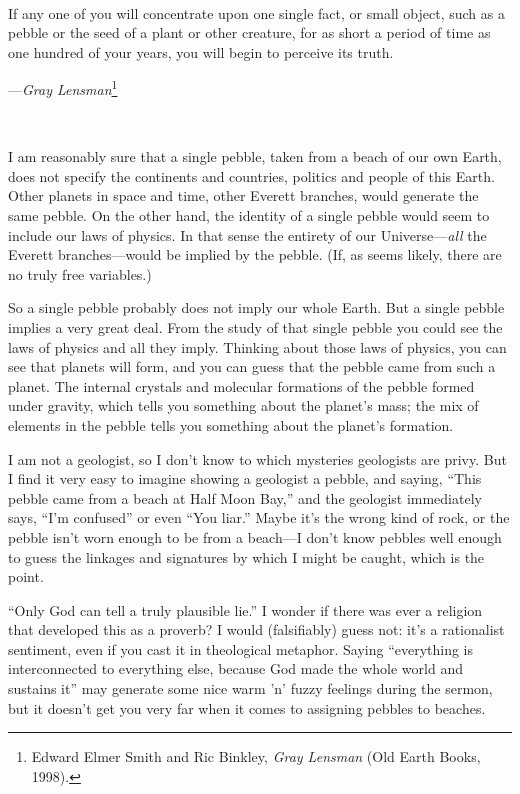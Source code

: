 \bigskip

{
 ~}

{
 If any one of you will concentrate upon one single fact, or small
object, such as a pebble or the seed of a plant or other creature, for
as short a period of time as one hundred of your years, you will begin
to perceive its truth.}

{\raggedleft
 {}---\textit{Gray Lensman}\footnote{Edward Elmer Smith and Ric Binkley, \textit{Gray Lensman} (Old
Earth Books, 1998).}
\par}


\bigskip

{
 ~}

{
 I am reasonably sure that a single pebble, taken from a beach of
our own Earth, does not specify the continents and countries, politics
and people of this Earth. Other planets in space and time, other
Everett branches, would generate the same pebble. On the other hand,
the identity of a single pebble would seem to include our laws of
physics. In that sense the entirety of our Universe---\textit{all} the
Everett branches---would be implied by the pebble. (If, as seems
likely, there are no truly free variables.)}

{
 So a single pebble probably does not imply our whole Earth. But a
single pebble implies a very great deal. From the study of that single
pebble you could see the laws of physics and all they imply. Thinking
about those laws of physics, you can see that planets will form, and
you can guess that the pebble came from such a planet. The internal
crystals and molecular formations of the pebble formed under gravity,
which tells you something about the planet's mass; the
mix of elements in the pebble tells you something about the
planet's formation.}

{
 I am not a geologist, so I don't know to which
mysteries geologists are privy. But I find it very easy to imagine
showing a geologist a pebble, and saying, ``This
pebble came from a beach at Half Moon Bay,'' and the
geologist immediately says, ``I'm
confused'' or even ``You
liar.'' Maybe it's the wrong kind of
rock, or the pebble isn't worn enough to be from a
beach---I don't know pebbles well enough to guess the
linkages and signatures by which I might be caught, which is the
point.}

{
 ``Only God can tell a truly plausible
lie.'' I wonder if there was ever a religion that
developed this as a proverb? I would (falsifiably) guess not:
it's a rationalist sentiment, even if you cast it in
theological metaphor. Saying ``everything is
interconnected to everything else, because God made the whole world and
sustains it'' may generate some nice warm
'n' fuzzy feelings during the sermon,
but it doesn't get you very far when it comes to
assigning pebbles to beaches.}

